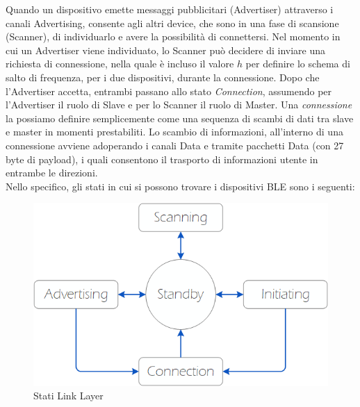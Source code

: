 \noindent Quando un dispositivo emette messaggi pubblicitari (Advertiser) attraverso i canali Advertising, consente agli altri device, che sono in una fase di scansione (Scanner), di individuarlo e avere la possibilità di connettersi. Nel momento in cui un Advertiser viene individuato, lo Scanner può decidere di inviare una richiesta di connessione, nella quale è incluso il valore $h$ per definire lo schema di salto di frequenza, per i due dispositivi, durante la connessione. Dopo che l'Advertiser accetta, entrambi passano allo stato \textit{Connection}, assumendo per l'Advertiser il ruolo di Slave e per lo Scanner il ruolo di Master. 
Una \textit{connessione} la possiamo definire semplicemente come una sequenza di scambi di dati tra slave e master in momenti prestabiliti. Lo scambio di informazioni, all'interno di una connessione avviene adoperando i canali Data e tramite pacchetti Data (con 27 byte di payload), i quali consentono il trasporto di informazioni utente in entrambe le direzioni.\\
Nello specifico, gli stati in cui si possono trovare i dispositivi BLE sono i seguenti:

\begin{figure}[!ht]
    \centering
    \includegraphics[width = \textwidth]{images/Link layer states.png}
    \caption{Stati Link Layer}
    \label{fig:link_layer_states}
\end{figure}

